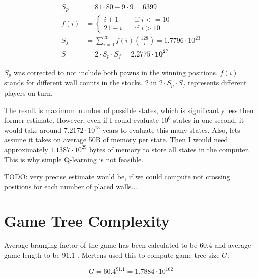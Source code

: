 \begin{center}
  \vspace*{-1.30cm}
  \begin{equation}
    \label{eqn:myestimate}
    \begin{aligned}
      S_p &= 81 {\cdot} 80 - 9 {\cdot} 9 = 6399\\[-0.20cm]
      f(i)\!&=\! \begin{cases}
        i + 1  & \quad \text{if } i <= 10 \\[-0.30cm]
        21 - i & \quad \text{if } i > 10
      \end{cases}\\
      S_f\! &=\! \sum_{i=0}^{20} f(i){128 \choose i} = 1.7796 {\cdot} 10^{23}
      \\
      S &= 2 {\cdot} S_p {\cdot} S_f = \mathbf{2.2775 {\cdot} 10^{27}}
    \end{aligned}
  \end{equation}
  \vspace*{-1.15cm}
\end{center}

$S_p$ was corrected to not include both pawns in the winning positions.
$f(i)$ %
stands for different wall counts in the stocks.
$2$ in $2{\cdot} S_p {\cdot} S_f$ represents different players on turn.

The result is maximum number of possible states, which is significantly
less then former estimate. However, even if I could evaluate $10^{6}$
states in one second, it would take around $7.2172{\cdot}10^{13}$ years to
evaluate this many states. Also, lets assume it takes on average 50B
of memory per state. Then I would need approximately
$1.1387{\cdot}10^{29}$ bytes of memory to store all states in the
computer. This is why simple Q-learning is not feasible.

{\color{red}TODO: very precise estimate would be, if we could compute not crossing
positions for each number of placed walls...}

\section{Game Tree Complexity}
Average branging factor of the game has been calculated to be $60.4$ and
average game length to be $91.1$ \cite{glendenning}. Mertens \cite{mertens}
used this to compute game-tree size $G$:
\begin{center}
  \vspace*{-1.30cm}
  \begin{equation}
    \label{eqn:mgtc}
    G = 60.4^{91.1} = 1.7884{\cdot}10^{162}
  \end{equation}
  \vspace*{-1.30cm}
\end{center}

